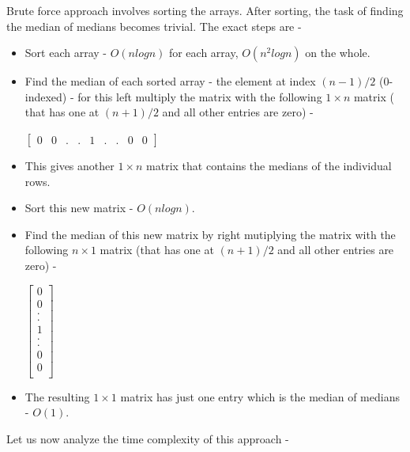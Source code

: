 \documentclass[journal,12pt,twocolumn]{IEEEtran}
\begin{document}
Brute force approach involves sorting the arrays. After sorting, the task of finding the median of medians becomes trivial.
The exact steps are - 
\begin{itemize}
    \item Sort each array - $O(nlogn)$ for each array, $O(n^{2}logn)$ on the whole.
    \item Find the median of each sorted array - the element at  index $(n-1)/2$ (0-indexed) - for this left multiply the matrix with the following $1 \times n$ matrix ( that has one at $(n+1)/2$ and all other entries are zero)  - 

    \begin{center}
        
        $
        \begin{bmatrix}
            0 & 0 & . & . & 1 & . & . & 0 & 0 
        \end{bmatrix}
        $
        
    \end{center}

    
    \item This gives another $1 \times n$ matrix that contains the medians of the individual rows. 
    \item Sort this new matrix - $O(nlogn)$.
    \item Find the median of this new matrix by right mutiplying the matrix with the following $n \times 1 $ matrix (that has one at $(n+1)/2$ and all other entries are zero) - 
    
    \begin{center}
        

        $
        \begin{bmatrix}
            0\\
            0\\
            .\\
            .\\
            1\\
            .\\
            .\\
            0\\
            0\\
        \end{bmatrix}
        $
      
    \end{center}

    \item The resulting $1\times1$ matrix has just one entry which is the median of medians - $O(1)$.
\end{itemize}
Let us now analyze the time complexity of this approach - 
\newline
\end{document}
